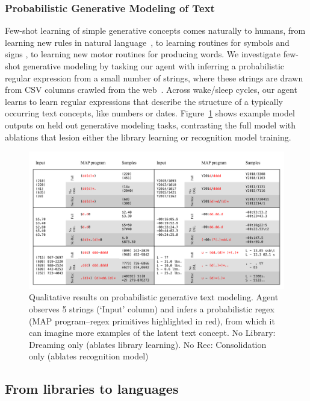 \documentclass{article}
\begin{document}
\subsubsection{Probabilistic Generative Modeling of Text}
Few-shot learning of simple generative concepts comes naturally to
humans, from learning new rules in natural language~\cite{marcus1999rule},
to learning routines for symbols and signs
\cite{lake2015human},
to learning new motor routines for producing words.
We investigate few-shot generative modeling by tasking our
agent with inferring a probabilistic regular expression from a small
number of strings, where these strings are drawn from CSV columns crawled from the web~\cite{mws}. Across wake/sleep cycles, our agent learns to learn
regular expressions that describe the structure of a typically occurring text concepts,
like numbers or dates.
Figure~\ref{qualitativeRegex} shows example model outputs on held out generative modeling tasks,
contrasting the full model with ablations that lesion either the library learning or recognition model training.
\begin{figure}
  \includegraphics[width = \textwidth]{figures/regexQualitative.pdf}
  \caption{Qualitative results on probabilistic generative text modeling. Agent observes 5 strings (`Input' column) and infers a probabilistic regex (MAP program--regex primitives highlighted in red), from which it can imagine more examples of the latent text concept. No Library: Dreaming only (ablates library learning). No Rec: Consolidation only (ablates recognition model)}\label{qualitativeRegex}
\end{figure}

\subsection{From libraries to languages}
\end{document}
